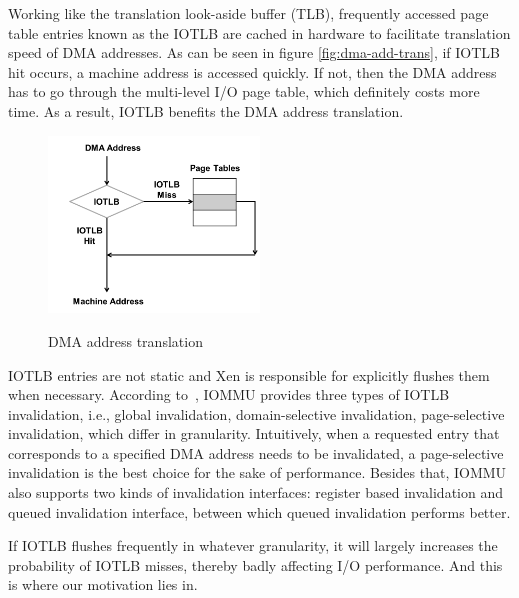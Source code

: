 Working like the translation look-aside buffer (TLB), frequently accessed page table entries known as the IOTLB are cached in hardware to facilitate translation speed of DMA addresses. As can be seen in figure \ref{fig:dma-add-trans}, if IOTLB hit occurs, a machine address is accessed quickly. If not, then the DMA address has to go through the multi-level I/O page table, which definitely costs more time. As a result, IOTLB benefits the DMA address translation.

\begin{figure}[ht]
\centering
\includegraphics[width=0.5\textwidth]{image/background/dma-address-translation.png} \\
\caption{DMA address translation}
\label{fig: dma-add-trans}
\end{figure}

IOTLB entries are not static and Xen is responsible for explicitly flushes them when necessary. According to~\cite{intelvt}, IOMMU provides three types of IOTLB invalidation, i.e., global invalidation, domain-selective invalidation, page-selective invalidation, which differ in granularity. Intuitively, when a requested entry that corresponds to a specified DMA address needs to be invalidated, a page-selective invalidation is the best choice for the sake of performance. Besides that, IOMMU also supports two kinds of invalidation interfaces: register based invalidation and queued invalidation interface, between which queued invalidation performs better.

If IOTLB flushes frequently in whatever granularity, it will largely increases the probability of IOTLB misses, thereby badly affecting I/O performance. And this is where our motivation lies in.
